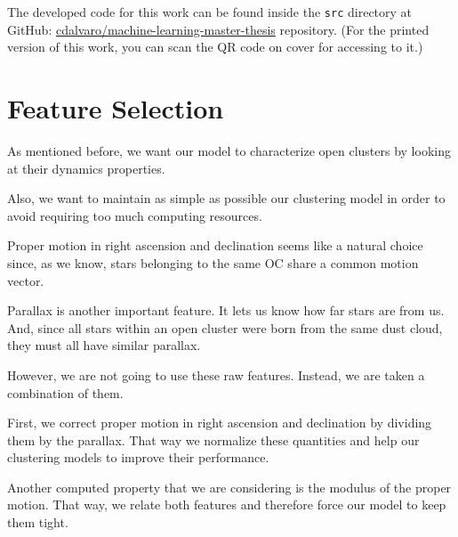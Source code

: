 \documentclass[11pt, a4paper, english]{book}
\begin{document}
The developed code for this work can be found inside the \verb|src| directory at GitHub:
\href{https://github.com/cdalvaro/machine-learning-master-thesis}{cdalvaro/machine-learning-master-thesis} repository.
(For the printed version of this work, you can scan the QR code on cover for accessing to it.)

\section{Feature Selection}
\label{sec:feature_selection}

As mentioned before, we want our model to characterize open clusters by looking at their dynamics properties.

Also, we want to maintain as simple as possible our clustering model in order to avoid requiring too much computing resources.

Proper motion in right ascension and declination seems like a natural choice since, as we know, stars belonging to the same OC share a common motion vector.

Parallax is another important feature. It lets us know how far stars are from us.
And, since all stars within an open cluster were born from the same dust cloud, they must all have similar parallax.

However, we are not going to use these raw features. Instead, we are taken a combination of them.

First, we correct proper motion in right ascension and declination by dividing them by the parallax.
That way we normalize these quantities and help our clustering models to improve their performance.

Another computed property that we are considering is the modulus of the proper motion.
That way, we relate both features and therefore force our model to keep them tight.
\end{document}

